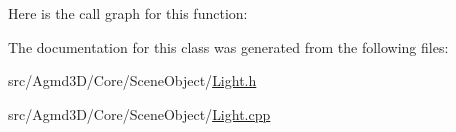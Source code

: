 Here is the call graph for this function\+:




The documentation for this class was generated from the following files\+:\begin{DoxyCompactItemize}
\item 
src/\+Agmd3\+D/\+Core/\+Scene\+Object/\hyperlink{_light_8h}{Light.\+h}\item 
src/\+Agmd3\+D/\+Core/\+Scene\+Object/\hyperlink{_light_8cpp}{Light.\+cpp}\end{DoxyCompactItemize}
